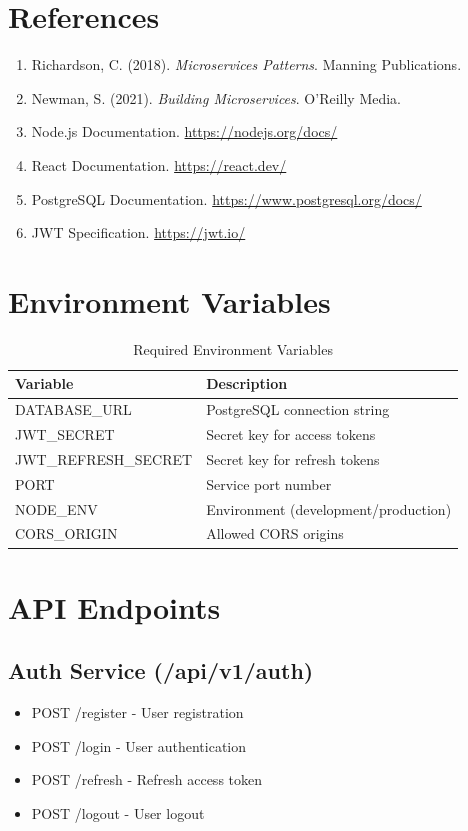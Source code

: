 \documentclass[12pt,a4paper]{article}
\begin{document}
\section{References}

\begin{enumerate}
    \item Richardson, C. (2018). \textit{Microservices Patterns}. Manning Publications.
    \item Newman, S. (2021). \textit{Building Microservices}. O'Reilly Media.
    \item Node.js Documentation. \url{https://nodejs.org/docs/}
    \item React Documentation. \url{https://react.dev/}
    \item PostgreSQL Documentation. \url{https://www.postgresql.org/docs/}
    \item JWT Specification. \url{https://jwt.io/}
\end{enumerate}

\appendix

\section{Environment Variables}

\begin{table}[H]
\centering
\small
\begin{tabular}{@{}ll@{}}
\toprule
\textbf{Variable} & \textbf{Description} \\ \midrule
DATABASE\_URL & PostgreSQL connection string \\
JWT\_SECRET & Secret key for access tokens \\
JWT\_REFRESH\_SECRET & Secret key for refresh tokens \\
PORT & Service port number \\
NODE\_ENV & Environment (development/production) \\
CORS\_ORIGIN & Allowed CORS origins \\ \bottomrule
\end{tabular}
\caption{Required Environment Variables}
\end{table}

\section{API Endpoints}

\subsection{Auth Service (/api/v1/auth)}
\begin{itemize}
    \item POST /register - User registration
    \item POST /login - User authentication
    \item POST /refresh - Refresh access token
    \item POST /logout - User logout
\end{itemize}
\end{document}
